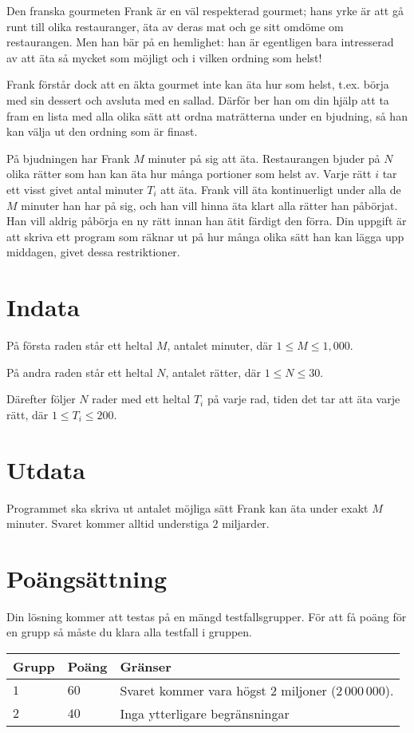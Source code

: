 Den franska gourmeten Frank är en väl respekterad gourmet; hans yrke är att gå runt till olika restauranger, äta av deras mat och ge sitt omdöme om restaurangen.
Men han bär på en hemlighet: han är egentligen bara intresserad av att äta så mycket som möjligt och i vilken ordning som helst!

Frank förstår dock att en äkta gourmet inte kan äta hur som helst, t.ex. börja med sin dessert och avsluta med en sallad.
Därför ber han om din hjälp att ta fram en lista med alla olika sätt att ordna maträtterna under en bjudning, så han kan välja ut den ordning som är finast.

På bjudningen har Frank $M$ minuter på sig att äta.
Restaurangen bjuder på $N$ olika rätter som han kan äta hur många portioner som helst av.
Varje rätt $i$ tar ett visst givet antal minuter $T_i$ att äta.
Frank vill äta kontinuerligt under alla de $M$ minuter han har på sig, och han vill hinna äta klart alla rätter han påbörjat.
Han vill aldrig påbörja en ny rätt innan han ätit färdigt den förra.
Din uppgift är att skriva ett program som räknar ut på hur många olika sätt han kan lägga upp middagen, givet dessa restriktioner.

\section*{Indata}
På första raden står ett heltal $M$, antalet minuter, där $1 \le M \le 1,000$.

På andra raden står ett heltal $N$, antalet rätter, där $1 \le N \le 30$.

Därefter följer $N$ rader med ett heltal $T_i$ på varje rad, tiden det tar att äta varje rätt, där $1 \le T_i \le 200$.

\section*{Utdata}
Programmet ska skriva ut antalet möjliga sätt Frank kan äta under exakt $M$ minuter.
Svaret kommer alltid understiga $2$ miljarder.

\section*{Poängsättning}
Din lösning kommer att testas på en mängd testfallsgrupper.
För att få poäng för en grupp så måste du klara alla testfall i gruppen.

\noindent
\begin{tabular}{| l | l | p{12cm} |}
  \hline
  \textbf{Grupp} & \textbf{Poäng} & \textbf{Gränser} \\ \hline
  $1$    & $60$        & Svaret kommer vara högst $2$ miljoner ($2\,000\,000$). \\ \hline 
  $2$    & $40$        & Inga ytterligare begränsningar \\ \hline
\end{tabular}



